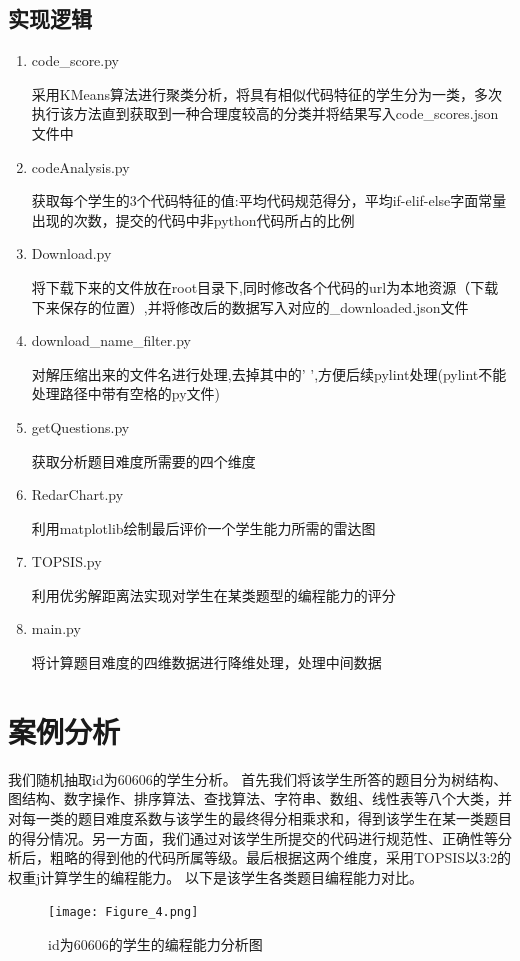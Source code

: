 \documentclass[UTF8]{ctexart}
\begin{document}
	\subsection{实现逻辑}
	\begin{enumerate}
		\item code\_score.py
		\par 采用KMeans算法进行聚类分析，将具有相似代码特征的学生分为一类，多次执行该方法直到获取到一种合理度较高的分类并将结果写入code\_scores.json文件中
		\item codeAnalysis.py
		\par 获取每个学生的3个代码特征的值:平均代码规范得分，平均if-elif-else字面常量出现的次数，提交的代码中非python代码所占的比例
		\item Download.py
		\par 将下载下来的文件放在root目录下,同时修改各个代码的url为本地资源（下载下来保存的位置）,并将修改后的数据写入对应的\_downloaded.json文件
		\item download\_name\_filter.py
		\par 对解压缩出来的文件名进行处理,去掉其中的' ',方便后续pylint处理(pylint不能处理路径中带有空格的py文件)
		\item getQuestions.py
		\par 获取分析题目难度所需要的四个维度
		\item RedarChart.py
		\par 利用matplotlib绘制最后评价一个学生能力所需的雷达图
		\item TOPSIS.py
		\par 利用优劣解距离法实现对学生在某类题型的编程能力的评分
		\item main.py
		\par 将计算题目难度的四维数据进行降维处理，处理中间数据
	\end{enumerate}
	
	
	\section{案例分析}\label{sec4}
	我们随机抽取id为60606的学生分析。
	首先我们将该学生所答的题目分为树结构、图结构、数字操作、排序算法、查找算法、字符串、数组、线性表等八个大类，并对每一类的题目难度系数与该学生的最终得分相乘求和，得到该学生在某一类题目的得分情况。另一方面，我们通过对该学生所提交的代码进行规范性、正确性等分析后，粗略的得到他的代码所属等级。最后根据这两个维度，采用TOPSIS以3:2的权重j计算学生的编程能力。
	以下是该学生各类题目编程能力对比。
	\begin{figure}[!htbp]
		\centering
		\texttt{[image: Figure\_4.png]}\\
		\caption{id为60606的学生的编程能力分析图}
	\end{figure}
	
\end{document}
